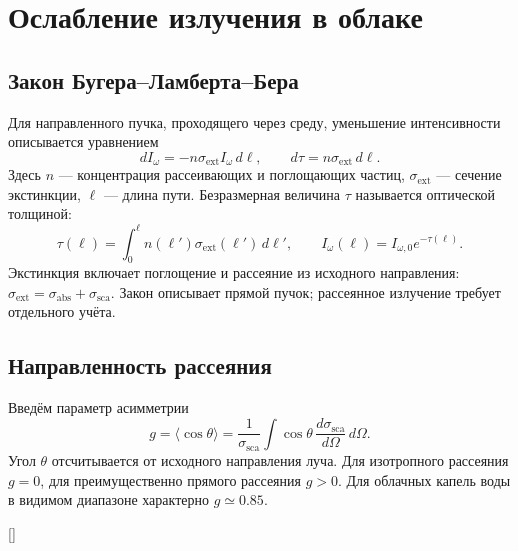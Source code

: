 \documentclass[../final.tex]{subfiles}
\begin{document}
\clearpage
\section{Ослабление излучения в облаке}
\subsection{Закон Бугера--Ламберта--Бера}
Для направленного пучка, проходящего через среду, уменьшение интенсивности
описывается уравнением
\begin{equation*}
 dI_\omega=-n\sigma_{\mathrm{ext}}I_\omega\,d\ell,\qquad
 d\tau=n\sigma_{\mathrm{ext}}\,d\ell.
\end{equation*}
Здесь $n$ --- концентрация рассеивающих и поглощающих частиц,
$\sigma_{\mathrm{ext}}$ --- сечение экстинкции, $\ell$ --- длина пути.
Безразмерная величина $\tau$ называется оптической толщиной:
\begin{equation*}
 \tau(\ell)=\int_0^\ell n(\ell')\sigma_{\mathrm{ext}}(\ell')\,d\ell',\qquad
 I_\omega(\ell)=I_{\omega,0}e^{-\tau(\ell)}.
\end{equation*}
Экстинкция включает поглощение и рассеяние из исходного направления:
$\sigma_{\mathrm{ext}}=\sigma_{\mathrm{abs}}+\sigma_{\mathrm{sca}}$.
Закон описывает прямой пучок; рассеянное излучение требует отдельного учёта.

\subsection{Направленность рассеяния}
Введём параметр асимметрии
\begin{equation*}
 g=\langle\cos\theta\rangle
 =\frac1{\sigma_{\mathrm{sca}}}
 \int\cos\theta\,\frac{d\sigma_{\mathrm{sca}}}{d\Omega}\,d\Omega.
\end{equation*}
Угол $\theta$ отсчитывается от исходного направления луча.
Для изотропного рассеяния $g=0$, для преимущественно прямого рассеяния $g>0$.
Для облачных капель воды в видимом диапазоне характерно $g\simeq0.85$.

\begin{rbox}[unbreakable,left=14pt,right=14pt,top=12pt,bottom=8pt]{[]}
\centering
\captionsetup{font=footnotesize,hypcap=false,skip=5pt}
\end{rbox}
\end{document}
